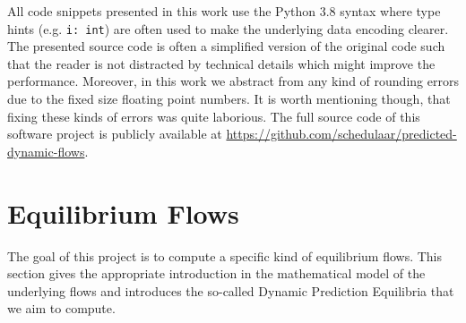 \documentclass[titlepage]{scrartcl}
\theoremstyle{definition}
\newcommand{\code}[1]{\texttt{#1}}
\begin{document}
    All code snippets presented in this work use the Python 3.8 syntax where type hints (e.g. \code{i: int}) are often used to make the underlying data encoding clearer.
    The presented source code is often a simplified version of the original code such that the reader is not distracted by technical details which might improve the performance.
    Moreover, in this work we abstract from any kind of rounding errors due to the fixed size floating point numbers.
    It is worth mentioning though, that fixing these kinds of errors was quite laborious. 
    The full source code of this software project is publicly available at \url{https://github.com/schedulaar/predicted-dynamic-flows}.

    \clearpage
    

    \clearpage
    \section{Equilibrium Flows}\label{sec:equilibrium-flows}

    The goal of this project is to compute a specific kind of equilibrium flows.
    This section gives the appropriate introduction in the mathematical model of the underlying flows and introduces the so-called Dynamic Prediction Equilibria that we aim to compute.
    
    
    

    \clearpage
    
    
    \clearpage
    

    \clearpage
    \printbibliography
\end{document}
